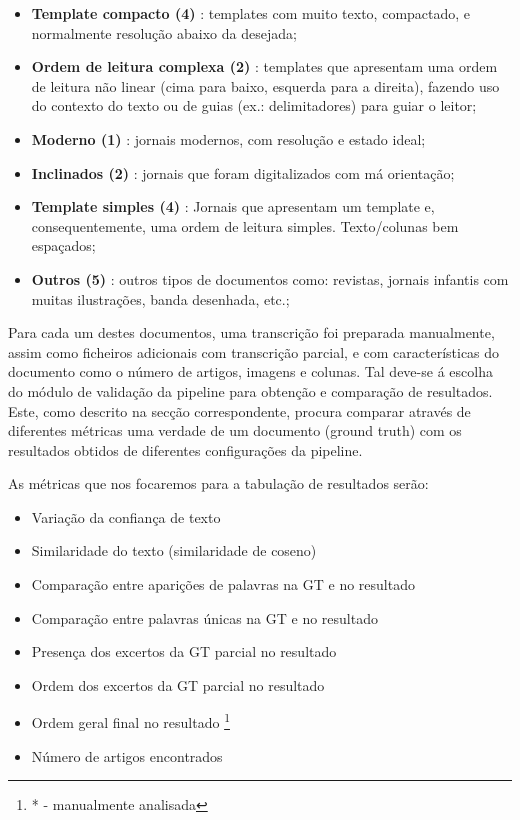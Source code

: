 \begin{itemize}\setlength\itemsep{-0.9em}
	\item \textbf{Template compacto (4)} : templates com muito texto, compactado, e normalmente resolução abaixo da desejada; 
	\item \textbf{Ordem de leitura complexa (2)} : templates que apresentam uma ordem de leitura não linear (cima para baixo, esquerda para a direita), fazendo uso do contexto do texto ou de guias (ex.: delimitadores) para guiar o leitor;
	\item \textbf{Moderno (1)} : jornais modernos, com resolução e estado ideal;
	\item \textbf{Inclinados (2)} : jornais que foram digitalizados com má orientação;
	\item \textbf{Template simples (4)} : Jornais que apresentam um template e, consequentemente, uma ordem de leitura simples. Texto/colunas bem espaçados;
	\item \textbf{Outros (5)} : outros tipos de documentos como: revistas, jornais infantis com muitas ilustrações, banda desenhada, etc.;
\end{itemize}

Para cada um destes documentos, uma transcrição foi preparada manualmente, assim como ficheiros adicionais com transcrição parcial, e com características do documento como o número de artigos, imagens e colunas. 
Tal deve-se á escolha do módulo de validação da pipeline para obtenção e comparação de resultados. Este, como descrito na secção correspondente, procura comparar através de diferentes métricas uma verdade de um documento (ground truth) com os resultados obtidos de diferentes configurações da pipeline.

As métricas que nos focaremos para a tabulação de resultados serão:

\begin{itemize}\setlength\itemsep{-0.9em}
	\item Variação da confiança de texto
	\item Similaridade do texto (similaridade de coseno)
	\item Comparação entre aparições de palavras na GT e no resultado
	\item Comparação entre palavras únicas na GT e no resultado
	\item Presença dos excertos da GT parcial no resultado
	\item Ordem dos excertos da GT parcial no resultado
	\item Ordem geral final no resultado \footnote{* - manualmente analisada}
	\item Número de artigos encontrados
\end{itemize}


